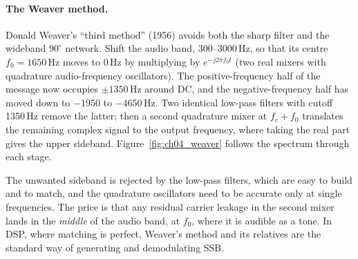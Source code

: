 \paragraph{The Weaver method.} Donald Weaver's ``third method'' (1956) avoids both the sharp filter and
the wideband $90^\circ$ network. Shift the audio band, 300--3000\,Hz, so that its centre $f_0=1650$\,Hz
moves to 0\,Hz by multiplying by $e^{-j2\pi f_0t}$ (two real mixers with quadrature audio-frequency
oscillators). The positive-frequency half of the message now occupies $\pm1350$\,Hz around DC, and the
negative-frequency half has moved down to $-1950$ to $-4650$\,Hz. Two identical low-pass filters with
cutoff 1350\,Hz remove the latter; then a second quadrature mixer at $f_c+f_0$ translates the remaining
complex signal to the output frequency, where taking the real part gives the upper sideband.
Figure~\ref{fig:ch04_weaver} follows the spectrum through each stage.

The unwanted sideband is rejected by the low-pass filters, which are easy to build and to match, and the
quadrature oscillators need to be accurate only at single frequencies. The price is that any residual
carrier leakage in the second mixer lands in the \emph{middle} of the audio band, at $f_0$, where it is
audible as a tone. In DSP, where matching is perfect, Weaver's method and its relatives are the standard
way of generating and demodulating SSB.


